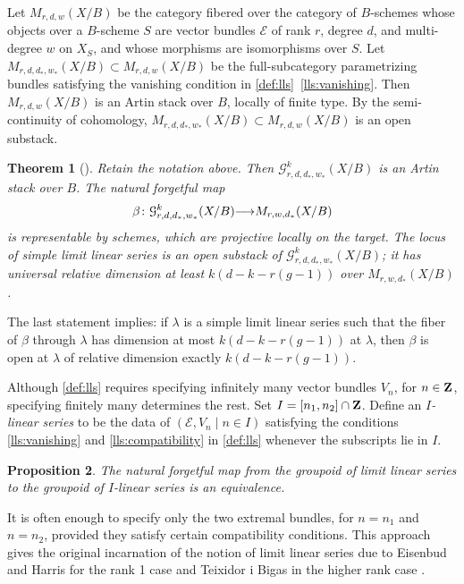 \documentclass[11pt,reqno]{amsart}
\theoremstyle{plain}
\newtheorem{theorem}{Theorem}[section]
\newtheorem{proposition}[theorem]{Proposition}
\theoremstyle{definition}
\theoremstyle{remark}
\numberwithin{equation}{section}
\renewcommand{\to}{{\longrightarrow}}
\numberwithin{equation}{section}
\begin{document}
Let $M_{r, d, w}(X/B)$ be the category fibered over the category of $B$-schemes whose objects over a $B$-scheme $S$ are vector bundles $\mathcal E$ of rank $r$, degree $d$, and multi-degree $w$ on $X_S$, and whose morphisms are isomorphisms over $S$.
Let $M_{r,d,d_*,w_*}(X/B) \subset M_{r,d,w}(X/B)$ be the full-subcategory  parametrizing bundles satisfying the vanishing condition in \autoref{def:lls}~\eqref{lls:vanishing}.
Then $M_{r,d,w}(X/B)$ is an Artin stack over $B$, locally of finite type.
By the semi-continuity of cohomology, $M_{r, d, d_*, w_*}(X/B) \subset M_{r,d,w}(X/B)$ is an open substack.

\begin{theorem}[{\cite[Theorem~3.4.7]{oss:14}}]
  \label{thm:lls}
  Retain the notation above.
  Then $\mathcal G^k_{r,d,d_*,w_*}(X/B)$ is an Artin stack over $B$.
  The natural forgetful map
  \[ \beta \from \mathcal G^k_{r,d,d_*,w_*}(X/B) \to M_{r,w,d_*}(X/B)\]
  is representable by schemes, which are projective locally on the target.
  The locus of simple limit linear series is an open substack of $\mathcal G^k_{r,d,d_*,w_*}(X/B)$; it has universal relative dimension at least $k(d-k-r(g-1))$ over $M_{r,w,d_*}(X/B)$.
\end{theorem}
The last statement implies: if $\lambda$ is a simple limit linear series such that the fiber of $\beta$ through $\lambda$ has dimension at most $k(d-k-r(g-1))$ at $\lambda$, then $\beta$ is open at $\lambda$ of relative dimension exactly $k(d-k-r(g-1))$.


Although \autoref{def:lls} requires specifying infinitely many vector bundles $V_n$, for $n \in {\bf Z}$, specifying finitely many determines the rest.
Set $I = [n_1, n_2] \cap {\bf Z}$.
Define an \emph{$I$-linear series} to be the data of $(\mathcal E, V_n \mid n \in I)$ satisfying the conditions \eqref{lls:vanishing} and \eqref{lls:compatibility} in \autoref{def:lls} whenever the subscripts lie in $I$.
\begin{proposition}\label{prop:lls_restricted}
  The natural forgetful map from the groupoid of limit linear series to the groupoid of $I$-linear series is an equivalence.
\end{proposition}

It is often enough to specify only the two extremal bundles, for $n = n_1$ and $n = n_2$, provided they satisfy certain compatibility conditions. 
This approach gives the original incarnation of the notion of limit linear series due to Eisenbud and Harris \cite{eis.har:86} for the rank 1 case and Teixidor i Bigas in the higher rank case \cite{tei-i-big:91}.
\end{document}
